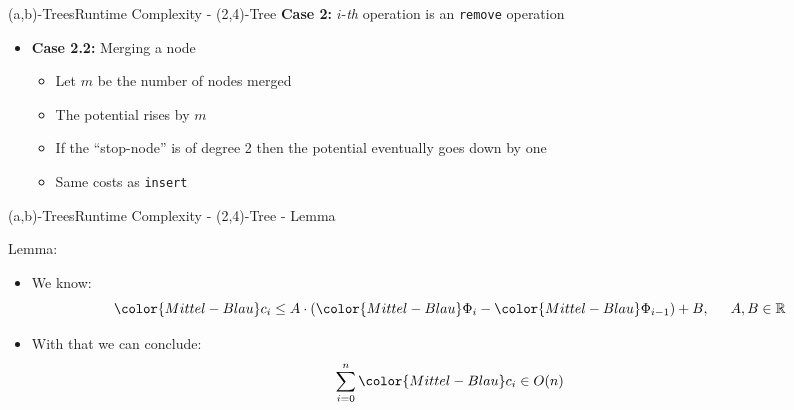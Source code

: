 \begin{frame}{(a,b)-Trees}{Runtime Complexity - (2,4)-Tree}
  \textbf{Case 2:}
  {\color{Mittel-Blau}$i$}-\textit{th} operation is an
  \texttt{\color{Mittel-Blau}remove} operation
  \begin{itemize}
    \item
    \textbf{Case 2.2:} Merging a node
    \begin{itemize}
      \item<3->
        Let {\color{Mittel-Blau}$m$} be the number of nodes merged
      \item<4->
        The potential rises by {\color{Mittel-Blau}$m$}
      \item<5->
        If the \enquote{stop-node} is of {\color{Mittel-Blau}degree 2} then the
        potential eventually goes down by one
      \item<6->
        Same costs as \texttt{\color{Mittel-Blau}insert}
    \end{itemize}
  \end{itemize}
\end{frame}


\begin{frame}{(a,b)-Trees}{Runtime Complexity - (2,4)-Tree - Lemma}
  \begin{block}{Lemma:}
    \begin{itemize}
      \item<2->
        We know:
        \begin{displaymath}
        {\color{Mittel-Blau}c_i} \leq A \cdot \left(
        {\color{Mittel-Blau}\Phi_i} - {\color{Mittel-Blau}\Phi_{i-1}}
        \right) + B, \hspace{1.5em}A,B \in \mathbb{R}
        \end{displaymath}
      \item<3->
        With that we can conclude:
        \begin{displaymath}
          \sum_{i=0}^{n} {\color{Mittel-Blau}c_i} \in O(n)
        \end{displaymath}
    \end{itemize}
  \end{block}
\end{frame}


